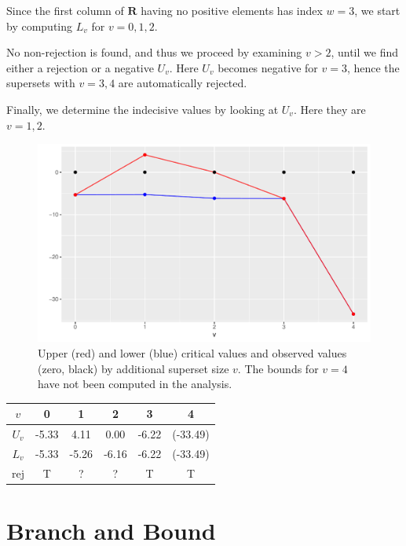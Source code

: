 \documentclass[11pt,a4paper,openright,twoside]{article}
\begin{document}
Since the first column of $\mathbf{R}$ having no positive elements has index $w=3$, we start by computing $L_v$ for $v=0,1,2$.

No non-rejection is found, and thus we proceed by examining $v>2$, until we find either a rejection or a negative $U_v$. Here $U_v$ becomes negative for $v=3$, hence the supersets with $v=3,4$ are automatically rejected.

Finally, we determine the indecisive values by looking at $U_v$. Here they are $v=1,2$.

\begin{figure}[h!]
\centering
\includegraphics[scale=0.57]{plot1.pdf}
\caption{Upper (red) and lower (blue) critical values and observed values (zero, black) by additional superset size $v$. The bounds for $v=4$ have not been computed in the analysis.}
\end{figure}


\begin{table}[h!]
\centering
\begin{tabular}{cccccc}
\toprule
$v$ & 0 & 1 & 2 & 3 & 4\\
\midrule
$U_v$ & -5.33 & 4.11 & 0.00 & -6.22 & (-33.49)\\
$L_v$ & -5.33 & -5.26 & -6.16 & -6.22 & (-33.49)\\
\midrule
rej & T & ? & ? & T & T\\
\bottomrule
\end{tabular}
\end{table}


\newpage
\section{Branch and Bound}
\end{document}
